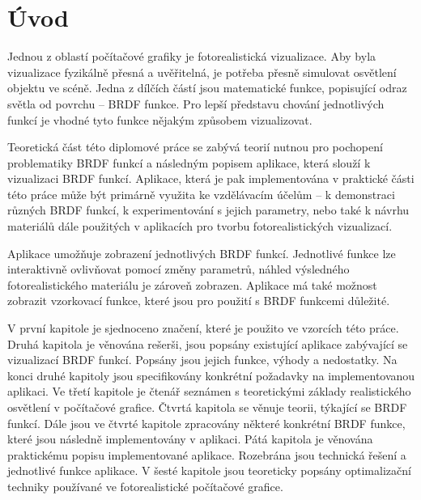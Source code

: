 \documentclass[czech,master]{diploma}
\begin{document}
\MakeTitlePages

\listoffigures
\clearpage

\listoftables
\clearpage

\chapter{Úvod}
\setcounter{page}{1} %
Jednou z oblastí počítačové grafiky je fotorealistická vizualizace. Aby byla vizualizace fyzikálně přesná a uvěřitelná, je potřeba přesně simulovat osvětlení objektu ve scéně. Jedna z dílčích částí jsou matematické funkce, popisující odraz světla od povrchu -- BRDF funkce. Pro lepší představu chování jednotlivých funkcí je vhodné tyto funkce nějakým způsobem vizualizovat. \par
Teoretická část této diplomové práce se zabývá teorií nutnou pro pochopení problematiky BRDF funkcí a následným popisem aplikace, která slouží k vizualizaci BRDF funkcí. Aplikace, která je pak implementována v praktické části této práce může být primárně využita ke vzdělávacím účelům -- k demonstraci různých BRDF funkcí, k experimentování s jejich parametry, nebo také k návrhu materiálů dále použitých v aplikacích pro tvorbu fotorealistických vizualizací. \par
Aplikace umožňuje zobrazení jednotlivých BRDF funkcí. Jednotlivé funkce lze interaktivně ovlivňovat pomocí změny parametrů, náhled výsledného fotorealistického materiálu je zároveň zobrazen. Aplikace má také možnost zobrazit vzorkovací funkce, které jsou pro použití s BRDF funkcemi důležité. \par
V první kapitole je sjednoceno značení, které je použito ve vzorcích této práce. Druhá kapitola je věnována rešerši, jsou popsány existující aplikace zabývající se vizualizací BRDF funkcí. Popsány jsou jejich funkce, výhody a nedostatky. Na konci druhé kapitoly jsou specifikovány konkrétní požadavky na implementovanou aplikaci. Ve třetí kapitole je čtenář seznámen s teoretickými základy realistického osvětlení v počítačové grafice. Čtvrtá kapitola se věnuje teorii, týkající se BRDF funkcí. Dále jsou ve čtvrté kapitole zpracovány některé konkrétní BRDF funkce, které jsou následně implementovány v aplikaci. Pátá kapitola je věnována praktickému popisu implementované aplikace. Rozebrána jsou technická řešení a jednotlivé funkce aplikace. V šesté kapitole jsou teoreticky popsány optimalizační techniky používané ve fotorealistické počítačové grafice.
\end{document}
